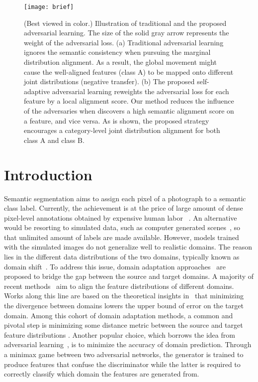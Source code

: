 \documentclass[10pt,twocolumn,letterpaper]{article}
\begin{document}
\begin{figure}[t]
\centering
\texttt{[image: brief]}
\caption{(Best viewed in color.) Illustration of traditional and the proposed adversarial learning. The size of the solid gray arrow represents the weight of the adversarial loss. (a) Traditional adversarial learning ignores the semantic consistency when pursuing the marginal distribution alignment. As a result, the global movement might cause the well-aligned features (class A) to be mapped onto different joint distributions (negative transfer). (b) The proposed self-adaptive adversarial learning reweights the adversarial loss for each feature by a local alignment score. Our method reduces the influence of the adversaries when discovers a high semantic alignment score on a feature, and vice versa. As is shown, the proposed strategy encourages a category-level joint distribution alignment for both class A and class B.}
\label{fig:Brief} 
\vspace{-2mm}
\end{figure}
\section{Introduction}
Semantic segmentation aims to assign each pixel of a photograph to a semantic class label. Currently, the achievement is at the price of large amount of dense pixel-level annotations obtained by expensive human labor ~\cite{chen2018deeplab,long2015fcn,luo2018macro}. An alternative would be resorting to simulated data, such as computer generated scenes~\cite{richter2016gta5,ros2016synthia}, so that unlimited amount of labels are made available. However, models trained with the simulated images do not generalize well to realistic domains. The reason lies in the different data distributions of the two domains, typically known as domain shift~\cite{shimodaira2000improving}. To address this issue, domain adaptation approaches~\cite{saito2017maximum,tsai2018OutputSpace,hoffman2017cycada,zhong2019invariance,kang2018deep,kang2019contrastive,he2019filter,zhu2019simreal} are proposed to bridge the gap between the source and target domains. A majority of recent methods~\cite{long2015MMD,sun2016deep,tzeng2017adversarial,tzeng2015simultaneous} aim to align the feature distributions of different domains. Works along this line are based on the theoretical insights in~\cite{ben2010theory} that minimizing the divergence between domains lowers the upper bound of error on the target domain. Among this cohort of domain adaptation methods, a common and pivotal step is minimizing some distance metric between the source and target feature distributions \cite{long2015MMD,sun2016deep}. Another popular choice, which borrows the idea from adversarial
learning~\cite{goodfellow2014gan}, is to minimize the accuracy of domain prediction. Through a minimax game between two adversarial networks, the generator is trained to produce features that confuse the discriminator while the latter is required to correctly classify which domain the features are generated from. 
\end{document}
